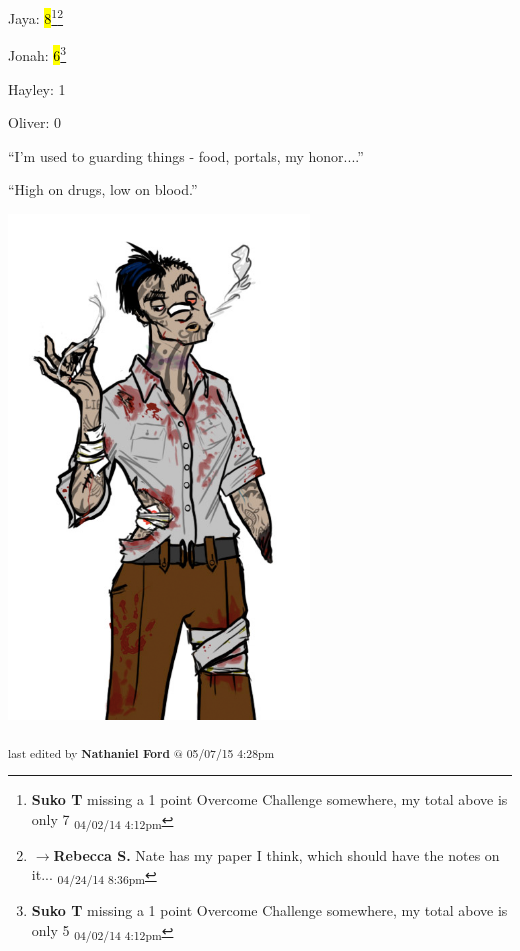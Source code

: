 
{
  \parskip=0pt
Jaya: \hl{8}\footnote{\textbf{Suko T }missing a 1 point Overcome Challenge somewhere, my total above is only 7 \textsubscript{04/02/14 4:12pm}}\footnote{$\rightarrow$\textbf{Rebecca S. }Nate has my paper I think, which should have the notes on it... \textsubscript{04/24/14 8:36pm}}

Jonah: \hl{6}\footnote{\textbf{Suko T }missing a 1 point Overcome Challenge somewhere, my total above is only 5 \textsubscript{04/02/14 4:12pm}}

Hayley: 1

Oliver: 0
}





``I'm used to guarding things -  food, portals, my honor....''



\newpage
``High on drugs, low on blood.''




\vspace{\fill}

\begin{flushright}
\includegraphics[width=8cm]{img/ch23_twisty_arm.png}

\textsubscript{last edited by \textbf{Nathaniel Ford} @ 05/07/15 4:28pm}
\end{flushright}


